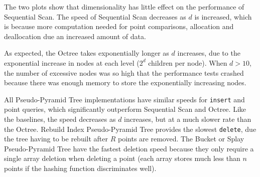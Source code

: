 The two plots show that dimensionality has little effect on the performance of Sequential Scan. The speed of Sequential Scan decreases as $d$ is increased, which is because more computation needed for point comparisons, allocation and deallocation due an increased amount of data.

As expected, the Octree takes exponentially longer as $d$ increases, due to the exponential increase in nodes at each level ($2^d$ children per node). When $d > 10$, the number of excessive nodes was so high that the performance tests crashed because there was enough memory to store the exponentially increasing nodes.

All Pseudo-Pyramid Tree implementations have similar speeds for \texttt{insert} and point queries, which significantly outperform Sequential Scan and Octree. Like the baselines, the speed decreases as $d$ increases, but at a much slower rate than the Octree. Rebuild Index Pseudo-Pyramid Tree provides the slowest \texttt{delete}, due the tree having to be rebuilt after $R$ points are removed. The Bucket or Splay Pseudo-Pyramid Tree have the fastest deletion speed because they only require a single array deletion when deleting a point (each array stores much less than $n$ points if the hashing function discriminates well).

